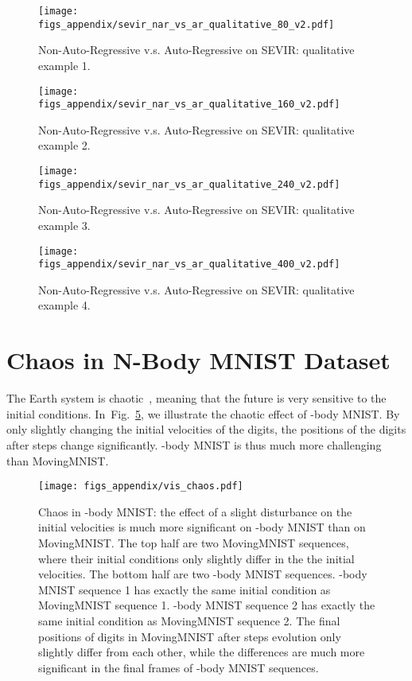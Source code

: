 \documentclass{article}
\newcommand{\figref}[1]{Fig.~\ref{#1}}
\def\nbody{-body MNIST}
\begin{document}
\begin{figure}[!tb]
\centering
\texttt{[image: figs\_appendix/sevir\_nar\_vs\_ar\_qualitative\_80\_v2.pdf]}
    \caption{Non-Auto-Regressive v.s. Auto-Regressive on SEVIR: qualitative example 1.}
    \label{fig:nar_vs_ar_80}
\end{figure}
\begin{figure}[!tb]
\centering
\texttt{[image: figs\_appendix/sevir\_nar\_vs\_ar\_qualitative\_160\_v2.pdf]}
    \caption{Non-Auto-Regressive v.s. Auto-Regressive on SEVIR: qualitative example 2.}
    \label{fig:nar_vs_ar_160}
\end{figure}
\begin{figure}[!tb]
\centering
\texttt{[image: figs\_appendix/sevir\_nar\_vs\_ar\_qualitative\_240\_v2.pdf]}
    \caption{Non-Auto-Regressive v.s. Auto-Regressive on SEVIR: qualitative example 3.}
    \label{fig:nar_vs_ar_240}
\end{figure}
\begin{figure}[!tb]
\centering
\texttt{[image: figs\_appendix/sevir\_nar\_vs\_ar\_qualitative\_400\_v2.pdf]}
    \caption{Non-Auto-Regressive v.s. Auto-Regressive on SEVIR: qualitative example 4.}
    \label{fig:nar_vs_ar_400}
\end{figure}

\clearpage
\section{Chaos in N-Body MNIST Dataset}
\label{sec:chaos-nbody}
The Earth system is chaotic~\cite{tapley2004grace}, meaning that the future is very sensitive to the initial conditions. In~\figref{fig:chaos_nbody}, we illustrate the chaotic effect of \nbody{}. By only slightly changing the initial velocities of the digits, the positions of the digits after  steps change significantly. \nbody{} is thus much more challenging than MovingMNIST.

\begin{figure}[!tb]
    \centering
    \texttt{[image: figs\_appendix/vis\_chaos.pdf]}
\caption{Chaos in \nbody{}: the effect of a slight disturbance on the initial velocities is much more significant on \nbody{} than on MovingMNIST. The top half are two MovingMNIST sequences, where their initial conditions only slightly differ in the the initial velocities. The bottom half are two \nbody{} sequences. \nbody{} sequence 1 has exactly the same initial condition as MovingMNIST sequence 1. \nbody{} sequence 2 has exactly the same initial condition as MovingMNIST sequence 2. The final positions of digits in MovingMNIST after  steps evolution only slightly differ from each other, while the differences are much more significant in the final frames of \nbody{} sequences.}
    \label{fig:chaos_nbody}
\end{figure}
\end{document}
